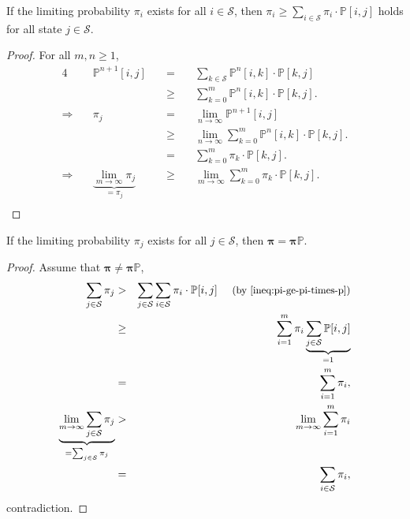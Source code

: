 \begin{inequality} \label{ineq:pi-ge-pi-times-p}
If the limiting probability $ \pi_{i} $ exists for all $ i \in \mathcal{S} $, then $ \pi_{i} \ge \sum_{i \in \mathcal{S}} \pi_{i} \cdot \mathbb{P}[i, j] $ holds for all state $ j \in \mathcal{S} $.

\begin{proof}
For all $ m, n \ge 1 $,
\begin{alignat*}{4}
  & \mathbb{P}^{n + 1}[i, j]
    & \quad=\quad & \sum_{k \in \mathcal{S}} \mathbb{P}^{n}[i, k] \cdot \mathbb{P}[k, j] \\
  & & \quad\ge\quad & \sum_{k = 0}^{m} \mathbb{P}^{n}[i, k] \cdot \mathbb{P}[k, j]. \\
\Rightarrow\quad
  & \pi_{j}
    & \quad=\quad & \lim_{n \to \infty} \mathbb{P}^{n + 1}[i, j] \\
  & & \quad\ge\quad & \lim_{n \to \infty} \sum_{k = 0}^{m} \mathbb{P}^{n}[i, k] \cdot \mathbb{P}[k, j]. \\
  & & \quad=\quad & \sum_{k = 0}^{m} \pi_{k} \cdot \mathbb{P}[k, j]. \\
\Rightarrow\quad
  & \underbrace{\lim_{m \to \infty} \pi_{j}}_{= \pi_{j}}
    & \quad\ge\quad & \lim_{m \to \infty} \sum_{k = 0}^{m} \pi_{k} \cdot \mathbb{P}[k, j]. \\
\end{alignat*}
\end{proof}
\end{inequality}

\begin{equality} \label{eq:pi-eq-pi-times-p}
If the limiting probability $ \pi_{j} $ exists for all $ j \in \mathcal{S} $, then $ \boldsymbol\pi = \boldsymbol\pi \mathbb{P} $.

\begin{proof}
Assume that $ \boldsymbol\pi \neq \boldsymbol\pi \mathbb{P} $,
\begin{eqnarray*}
\sum_{j \in \mathcal{S}} \pi_{j}
  & > & \sum_{j \in \mathcal{S}} \sum_{i \in \mathcal{S}} \pi_{i} \cdot \mathbb{P}[i, j]
    \text{\hspace{1em} \small(by \autoref{ineq:pi-ge-pi-times-p})} \\
  & \ge & \sum_{i = 1}^{m} \pi_{i} \underbrace{\sum_{j \in \mathcal{S}} \mathbb{P}[i, j]}_{= 1} \\
  & = & \sum_{i = 1}^{m} \pi_{i}, \\
\underbrace{\lim_{m \to \infty} \sum_{j \in \mathcal{S}} \pi_{j}}_{= \sum_{j \in \mathcal{S}} \pi_{j}}
  & > & \lim_{m \to \infty} \sum_{i = 1}^{m} \pi_{i} \\
  & = & \sum_{i \in \mathcal{S}} \pi_{i},
\end{eqnarray*}
contradiction.
\end{proof}
\end{equality}

